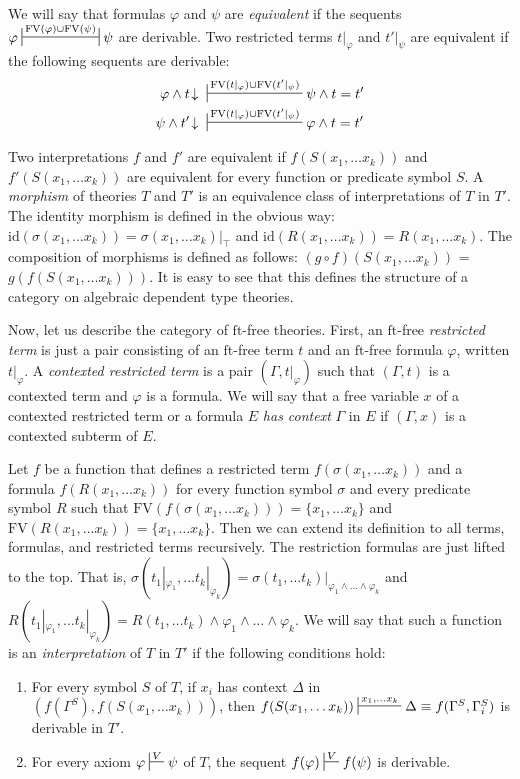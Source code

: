 \documentclass[reqno]{amsart}
\theoremstyle{definition}
\theoremstyle{remark}
\newcommand{\fs}[1]{\mathrm{#1}}
\newcommand{\FV}{\fs{FV}}
\newcommand{\ft}{\fs{ft}}
\newcommand{\id}{\fs{id}}
\numberwithin{figure}{section}
\begin{document}
We will say that formulas $\varphi$ and $\psi$ are \emph{equivalent} if the sequents $\varphi \ssststile{}{\FV(\varphi) \cup \FV(\psi)} \psi$ are derivable.
Two restricted terms $t|_\varphi$ and $t'|_\psi$ are equivalent if the following sequents are derivable:
\begin{align*}
\varphi \land t\!\downarrow\ & \sststile{}{\FV(t|_\varphi) \cup \FV(t'|_\psi)} \psi \land t = t' \\
\psi \land t'\!\downarrow\ & \sststile{}{\FV(t|_\varphi) \cup \FV(t'|_\psi)} \varphi \land t = t'
\end{align*}

Two interpretations $f$ and $f'$ are equivalent if $f(S(x_1, \ldots x_k))$ and $f'(S(x_1, \ldots x_k))$ are equivalent for every function or predicate symbol $S$.
A \emph{morphism} of theories $T$ and $T'$ is an equivalence class of interpretations of $T$ in $T'$.
The identity morphism is defined in the obvious way: $\id(\sigma(x_1, \ldots x_k)) = \sigma(x_1, \ldots x_k)|_\top$ and $\id(R(x_1, \ldots x_k)) = R(x_1, \ldots x_k)$.
The composition of morphisms is defined as follows: $(g \circ f)(S(x_1, \ldots x_k))$ = $g(f(S(x_1, \ldots x_k)))$.
It is easy to see that this defines the structure of a category on algebraic dependent type theories.

Now, let us describe the category of $\ft$-free theories.
First, an $\ft$-free \emph{restricted term} is just a pair consisting of an $\ft$-free term $t$ and an $\ft$-free formula $\varphi$, written $t|_\varphi$.
A \emph{contexted restricted term} is a pair $(\Gamma,t|_\varphi)$ such that $(\Gamma,t)$ is a contexted term and $\varphi$ is a formula.
We will say that a free variable $x$ of a contexted restricted term or a formula $E$ \emph{has context} $\Gamma$ in $E$ if $(\Gamma,x)$ is a contexted subterm of $E$.

Let $f$ be a function that defines a restricted term $f(\sigma(x_1, \ldots x_k))$ and a formula $f(R(x_1, \ldots x_k))$ for every function symbol $\sigma$ and every predicate symbol $R$ such that $\FV(f(\sigma(x_1, \ldots x_k))) = \{ x_1, \ldots x_k \}$ and $\FV(R(x_1, \ldots x_k)) = \{ x_1, \ldots x_k \}$.
Then we can extend its definition to all terms, formulas, and restricted terms recursively.
The restriction formulas are just lifted to the top.
That is, $\sigma(t_1|_{\varphi_1}, \ldots t_k|_{\varphi_k}) = \sigma(t_1, \ldots t_k)|_{\varphi_1 \land \ldots \land \varphi_k}$ and $R(t_1|_{\varphi_1}, \ldots t_k|_{\varphi_k}) = R(t_1, \ldots t_k) \land \varphi_1 \land \ldots \land \varphi_k$.
We will say that such a function is an \emph{interpretation} of $T$ in $T'$ if the following conditions hold:
\begin{enumerate}
\item \label{it:interp-symb} For every symbol $S$ of $T$, if $x_i$ has context $\Delta$ in $(f(\Gamma^S), f(S(x_1, \ldots x_k)))$, then $f(S(x_1, \ldots x_k)) \sststile{}{x_1, \ldots x_k} \Delta \equiv f(\Gamma^S,\Gamma^S_i)$ is derivable in $T'$.
\item \label{it:interp-axiom} For every axiom $\varphi \sststile{}{V} \psi$ of $T$, the sequent $f(\varphi) \sststile{}{V} f(\psi)$ is derivable.
\end{enumerate}
\end{document}
